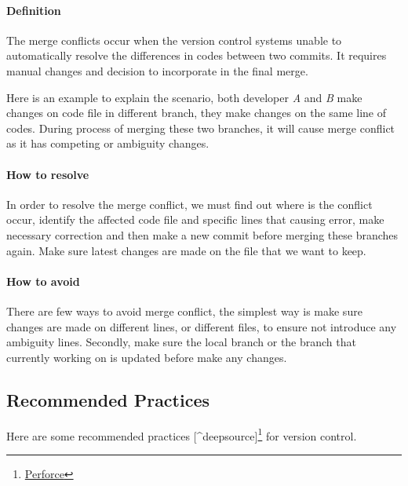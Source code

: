 \documentclass[
  letterpaper,
  DIV=11,
  numbers=noendperiod]{scrreport}
\let\oldparagraph\paragraph
\renewcommand{\paragraph}[1]{\oldparagraph{#1}\mbox{}}
\begin{document}
\hypertarget{definition}{%
\paragraph{Definition}\label{definition}}

The merge conflicts occur when the version control systems unable to
automatically resolve the differences in codes between two commits. It
requires manual changes and decision to incorporate in the final merge.

Here is an example to explain the scenario, both developer \emph{A} and
\emph{B} make changes on code file in different branch, they make
changes on the same line of codes. During process of merging these two
branches, it will cause merge conflict as it has competing or ambiguity
changes.

\hypertarget{how-to-resolve}{%
\paragraph{How to resolve}\label{how-to-resolve}}

In order to resolve the merge conflict, we must find out where is the
conflict occur, identify the affected code file and specific lines that
causing error, make necessary correction and then make a new commit
before merging these branches again. Make sure latest changes are made
on the file that we want to keep.

\hypertarget{how-to-avoid}{%
\paragraph{How to avoid}\label{how-to-avoid}}

There are few ways to avoid merge conflict, the simplest way is make
sure changes are made on different lines, or different files, to ensure
not introduce any ambiguity lines. Secondly, make sure the local branch
or the branch that currently working on is updated before make any
changes.

\hypertarget{recommended-practices}{%
\subsection{Recommended Practices}\label{recommended-practices}}

Here are some recommended practices {[}\^{}deepsource{]}\footnote{\href{https://www.perforce.com/blog/vcs/8-version-control-best-practices}{Perforce}}
for version control.
\end{document}
